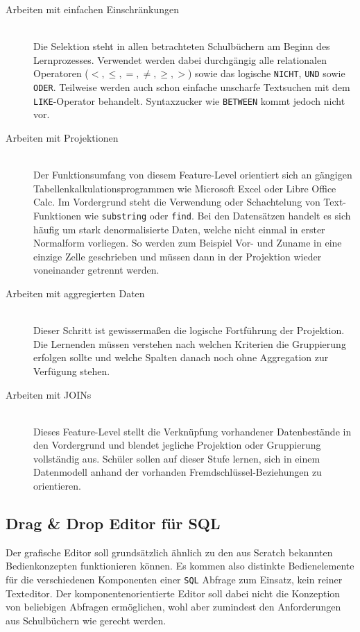 \begin{description}
\item[Arbeiten mit einfachen Einschränkungen] \hfill \\
  Die Selektion steht in allen betrachteten Schulbüchern am Beginn des Lernprozesses. Verwendet werden dabei durchgängig alle relationalen Operatoren ($<, \leq, =, \neq, \geq, >$) sowie das logische \lstinline{NICHT}, \lstinline{UND} sowie \lstinline{ODER}. Teilweise werden auch schon einfache unscharfe Textsuchen mit dem \lstinline{LIKE}-Operator behandelt. Syntaxzucker wie \lstinline{BETWEEN} kommt jedoch nicht vor.

\item[Arbeiten mit Projektionen] \hfill \\
  Der Funktionsumfang von diesem Feature-Level orientiert sich an gängigen Tabellenkalkulationsprogrammen wie Microsoft Excel oder Libre Office Calc. Im Vordergrund steht die Verwendung oder Schachtelung von Text-Funktionen wie \lstinline{substring} oder \lstinline{find}. Bei den Datensätzen handelt es sich häufig um stark denormalisierte Daten, welche nicht einmal in erster Normalform vorliegen. So werden zum Beispiel Vor- und Zuname in eine einzige Zelle geschrieben und müssen dann in der Projektion wieder voneinander getrennt werden.

\item[Arbeiten mit aggregierten Daten] \hfill \\
  Dieser Schritt ist gewissermaßen die logische Fortführung der Projektion. Die Lernenden müssen verstehen nach welchen Kriterien die Gruppierung erfolgen sollte und welche Spalten danach noch ohne Aggregation zur Verfügung stehen.

\item[Arbeiten mit JOINs] \hfill \\
  Dieses Feature-Level stellt die Verknüpfung vorhandener Datenbestände in den Vordergrund und blendet jegliche Projektion oder Gruppierung vollständig aus. Schüler sollen auf dieser Stufe lernen, sich in einem Datenmodell anhand der vorhanden Fremdschlüssel-Beziehungen zu orientieren.
\end{description}

\subsection{Drag \& Drop Editor für SQL}
\label{sec:design-sql-editor}

Der grafische Editor soll grundsätzlich ähnlich zu den aus Scratch bekannten Bedienkonzepten funktionieren können. Es kommen also distinkte Bedienelemente für die verschiedenen Komponenten einer \texttt{SQL} Abfrage zum Einsatz, kein reiner Texteditor. Der komponentenorientierte Editor soll dabei nicht die Konzeption von beliebigen Abfragen ermöglichen, wohl aber zumindest den Anforderungen aus Schulbüchern wie \cite{grimm_informatik_2015, hubwieser_inf_2} gerecht werden.

